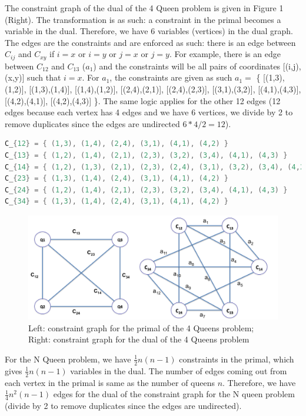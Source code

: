 \documentclass[9.5pt]{extarticle}
\begin{document}
The constraint graph of the dual of the 4 Queen problem is given in Figure 1 (Right). The transformation is as such: a constraint in the primal becomes a variable in the dual. Therefore, we have 6 variables (vertices) in the dual graph. The edges are the constraints and are enforced as such: there is an edge between $C_{ij}$ and $C_{xy}$ if $i=x$ or $i=y$ or $j=x$ or $j=y$. For example, there is an edge between $C_{12}$ and $C_{13}$ ($a_1$) and the constraints will be all pairs of coordinates [(i,j),(x,y)] such that $i=x$. For $a_1$, the constraints are given as such $a_{1} =$ \{ [(1,3),(1,2)], [(1,3),(1,4)], [(1,4),(1,2)], [(2,4),(2,1)], [(2,4),(2,3)], [(3,1),(3,2)], [(4,1),(4,3)], [(4,2),(4,1)], [(4,2),(4,3)] \}. The same logic applies for the other 12 edges (12 edges because each vertex has 4 edges and we have 6 vertices, we divide by 2 to remove duplicates since the edges are undirected $6*4/2=12$).\\

\begin{lstlisting}[language=java,caption={Constraints for primal of 4 Queens problem}]
C_{12} = { (1,3), (1,4), (2,4), (3,1), (4,1), (4,2) }
C_{13} = { (1,2), (1,4), (2,1), (2,3), (3,2), (3,4), (4,1), (4,3) }
C_{14} = { (1,2), (1,3), (2,1), (2,3), (2,4), (3,1), (3,2), (3,4), (4,2), (4,3) }
C_{23} = { (1,3), (1,4), (2,4), (3,1), (4,1), (4,2) }
C_{24} = { (1,2), (1,4), (2,1), (2,3), (3,2), (3,4), (4,1), (4,3) }
C_{34} = { (1,3), (1,4), (2,4), (3,1), (4,1), (4,2) }
\end{lstlisting} 

\begin{figure}[H]
\centering
\includegraphics[scale=0.4]{constraintdual.png}
\caption{Left: constraint graph for the primal of the 4 Queens problem; Right: constraint graph for the dual of the 4 Queens problem}
\label{Figure 1}
\end{figure}


For the N Queen problem, we have $\frac{1}{2}n(n-1)$ constraints in the primal, which gives $\frac{1}{2}n(n-1)$ variables in the dual. The number of edges coming out from each vertex in the primal is same as the number of queens $n$. Therefore, we have $\frac{1}{4}n^2(n-1)$ edges for the dual of the constraint graph for the N queen problem (divide by 2 to remove duplicates since the edges are undirected).\\
\end{document}
